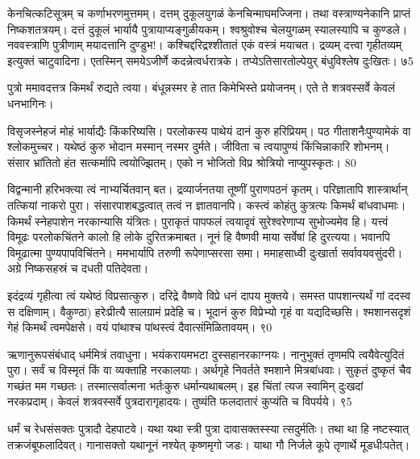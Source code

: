 केनचित्कटिसूत्रम् च कर्णाभरणमुत्तमम्।
दत्तम् दुकूलयुगळं केनचिन्माघमज्जिना।
तथा वस्त्राण्यनेकानि प्राप्तं निष्कशतत्रयम्।
दत्तं दुकूलं भार्यायै पुत्रायाप्यङ्गुळीयकम्।
श्वश्रुवोश्च चेलयुगळम् स्यालस्यापि च कुण्डले।
नववस्त्राणि पुत्रीणाम् मयादत्तानि दुण्डुभ!।
कश्चिद्दरिद्रश्शीतातं एकं वस्त्रं मयाचत।
द्रव्यम् दत्त्वा गृहीतव्यम् इत्युक्तं चाटुवादिना।
एतस्मिन् समयेऽजीर्णे कदन्नेत्वर्धरात्रके।
तप्येऽतिसारतोल्पेयुर् बंधुविश्लेष दुःखितः।
७5

पुत्रो ममावदत्तत्र किमर्थं रुद्यते त्वया।
बंधून्नस्मर हे तात किमेभिस्ते प्रयोजनम्।
एते ते शत्रवस्सर्वे केवलं धनभागिनः।

विसृजस्नेहजं मोहं भार्याद्यैः किंकरिष्यसि।
परलोकस्य पाथेयं दानं कुरु हरिप्रियम्।
पठ गीताशनैःपुण्यामेकं वा श्लोकमुच्चर।
यथेष्ठं कुरु भोदान मस्मान् नस्मर दुर्मते।
जीविता च त्वयापुण्यं किंचिन्नाकारि शोभनम्।
संसार भ्रांतितो हंत सत्कर्मापि त्वयोज्झितम्।
एको न भोजितो विप्र श्रोत्रियो नाप्युपस्कृतः।
80

विद्वन्मानी हरिभक्त्या त्वं नाभ्यर्चितवान् बत।
द्रव्यार्जनतया तूष्णीं पुराणपठनं कृतम्।
परिज्ञातापि शास्त्रार्थान् तत्कियां नाकरो पुरा।
संसारपाशबद्धत्वात् तत्वं न ज्ञातवानपि।
कस्त्वं कोहंतु कुत्रत्यः किमर्थं बांधवाधमाः।
किमर्थं स्नेहपाशेन नरकान्यासि यंत्रितः।
पुराकृतं पापफलं त्वयादृवं सुरेश्वरेणाप्य
सुभोज्यमेव हि।
यत्त्वं विमूढः परलोकचिंतने कालो
हि लोके दुरितक्रमाबत।
नूनं हि वैष्णवी माया सर्वेषां हि दुरत्यया।
भवानपि विमूढात्मा पुण्यपापविचिंतने।
ममभार्यापि तरुणी रूपेणाप्सरसा समा।
ममाहसाध्वी दुःखार्ता सर्वावयवसुंदरी।
अग्रे निष्कसहस्रं च दधती पतिदेवता।

इदंद्रव्यं गृहीत्वा त्वं यथेष्ठं विप्रसात्कुरु।
दरिद्रे वैष्णवे विप्रे धनं दापय मुक्तये।
समस्त पापशान्त्यर्थं गां ददस्व स दक्षिणाम्।
वैकुण्ठा) हरेःप्रीत्यै सालग्रामं प्रदेहि च।
भूदानं कुरु विप्रेभ्यो गृहं वा यद्यदिच्छसि।
श्मशानसदृशं गेहं किमर्थं त्वमपेक्षसे।
वयं पांथाश्च पांथस्त्वं दैवात्संमिळितावयम्।
९0

ऋणानुरूपसंबंधाद् धर्ममित्रं तवाधुना।
भयंकरायमभटा दुस्सहानरकाग्नयः।
नानुभुक्तं तृणमपि त्वयैवेत्युदितं पुरा।
सर्वं च विस्मृतं किं वा व्यक्ताहि नरकालयाः।
अर्थगृहे निवर्तते श्मशाने मित्रबांधवाः।
सुकृतं दुष्कृतं चैव गच्छंत मम गच्छतः।
तस्मात्सर्वात्मना भर्तःकुरु धर्मान्यथाबलम्।
इह चिंतां त्यज स्वामिन् दुःखदां नरकप्रदाम्।
केवलं शत्रवस्सर्वे पुत्रदारागृहादयः।
तुष्यंति फलदातारं कुप्यंति च विपर्यये।
९5

धर्मं च रेधसंसक्तः पुत्रादौ देहपाटवे।
यथा यथा स्त्री पुत्रा दावासक्तस्स्या त्सदुर्मतिः।
तथा था हि नष्टस्यात् तक्रजंबूफलादिवत्।
गानासक्तो यथानूनं नश्येत् कृष्णमृगो जडः।
याथा गौ निर्जले कूपे तृणार्थे मूडधीःपतेत्।

